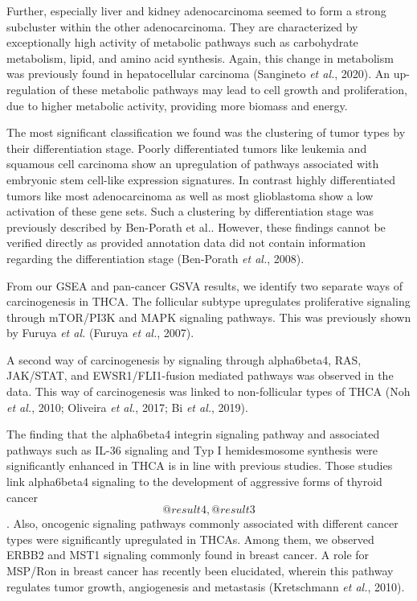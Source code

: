\documentclass[
  parskip,
  oneside]{scrreprt}
\begin{document}
Further, especially liver and kidney adenocarcinoma seemed to form a
strong subcluster within the other adenocarcinoma. They are
characterized by exceptionally high activity of metabolic pathways such
as carbohydrate metabolism, lipid, and amino acid synthesis. Again, this
change in metabolism was previously found in hepatocellular carcinoma
(Sangineto \emph{et al.}, 2020). An up-regulation of these metabolic
pathways may lead to cell growth and proliferation, due to higher
metabolic activity, providing more biomass and energy.

The most significant classification we found was the clustering of tumor
types by their differentiation stage. Poorly differentiated tumors like
leukemia and squamous cell carcinoma show an upregulation of pathways
associated with embryonic stem cell-like expression signatures. In
contrast highly differentiated tumors like most adenocarcinoma as well
as most glioblastoma show a low activation of these gene sets. Such a
clustering by differentiation stage was previously described by
Ben-Porath et al.. However, these findings cannot be verified directly
as provided annotation data did not contain information regarding the
differentiation stage (Ben-Porath \emph{et al.}, 2008).

From our GSEA and pan-cancer GSVA results, we identify two separate ways
of carcinogenesis in THCA. The follicular subtype upregulates
proliferative signaling through mTOR/PI3K and MAPK signaling pathways.
This was previously shown by Furuya \textit{et al.} (Furuya \emph{et
al.}, 2007).

A second way of carcinogenesis by signaling through alpha6beta4, RAS,
JAK/STAT, and EWSR1/FLI1-fusion mediated pathways was observed in the
data. This way of carcinogenesis was linked to non-follicular types of
THCA (Noh \emph{et al.}, 2010; Oliveira \emph{et al.}, 2017; Bi \emph{et
al.}, 2019).

The finding that the alpha6beta4 integrin signaling pathway and
associated pathways such as IL-36 signaling and Typ I hemidesmosome
synthesis were significantly enhanced in THCA is in line with previous
studies. Those studies link alpha6beta4 signaling to the development of
aggressive forms of thyroid cancer \[@result4,@result3\]. Also,
oncogenic signaling pathways commonly associated with different cancer
types were significantly upregulated in THCAs. Among them, we observed
ERBB2 and MST1 signaling commonly found in breast cancer. A role for
MSP/Ron in breast cancer has recently been elucidated, wherein this
pathway regulates tumor growth, angiogenesis and metastasis (Kretschmann
\emph{et al.}, 2010).
\end{document}
